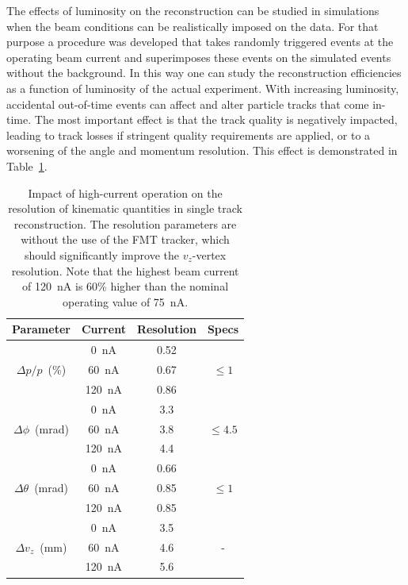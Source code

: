 \documentclass[final,3p]{elsarticle}
\begin{document}
\begin{twocolumn}
The effects of luminosity on the reconstruction can be studied in simulations when the beam conditions can be realistically
imposed on the data. For that purpose a procedure was developed that takes randomly triggered events at the operating
beam current and superimposes these events on the simulated events without the background. In this way one can study
the reconstruction efficiencies as a function of luminosity of the actual experiment. With increasing luminosity, accidental
out-of-time events can affect and alter particle tracks that come in-time. The most important effect is that the track
quality is negatively impacted, leading to track losses if stringent quality requirements are applied, or to a worsening of
the angle and momentum resolution. This effect is demonstrated in Table~\ref{resolution}.   

\begin{table}[htbp!]
\begin{center}
\begin{tabular}{c|c|c|c} \hline
  Parameter & Current & Resolution &Specs \\ \hline
  & 0~nA  & 0.52 & \\
$\Delta{p}/p$~(\%) &60~nA &  0.67& $\le 1$\\
& 120~nA &  0.86 &  \\ \hline 
&0~nA &  3.3 &  \\
$\Delta \phi$~(mrad)& 60~nA &  3.8 &  $\le 4.5$\\
&120~nA  & 4.4 &  \\ \hline
&0~nA &  0.66 &  \\
$\Delta \theta$~(mrad)& 60~nA &  0.85 &  $\le 1$\\
&120~nA  & 0.85 &  \\ \hline
& 0~nA & 3.5 &  \\
$\Delta{v_z}$~(mm) & 60~nA & 4.6 & -  \\
& 120~nA & 5.6 & \\ \hline
\end{tabular}
\caption{Impact of high-current operation on the resolution of kinematic quantities in single track reconstruction. The
  resolution parameters are without the use of the FMT tracker, which should significantly improve the $v_z$-vertex
  resolution. Note that the highest beam current of 120~nA is 60\% higher than the nominal operating value of 75~nA.}     
\label{resolution}
\end{center}
\end{table}


\end{twocolumn}
\end{document}
